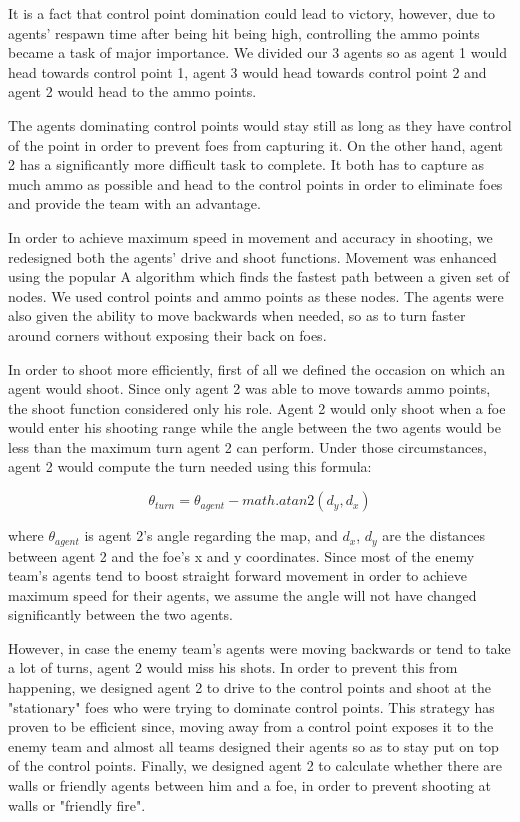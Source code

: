 \documentclass[conference]{IEEEtran}
\begin{document}
It is a fact that control point domination could lead to victory, however, due to agents' respawn time after being hit being high, controlling the ammo points became a task of major importance. We divided our 3 agents so as agent 1 would head towards control point 1, agent 3 would head towards control point 2 and agent 2 would head to the ammo points.

The agents dominating control points would stay still as long as they have control of the point in order to prevent foes from capturing it. On the other hand, agent 2 has a significantly more difficult task to complete. It both has to capture as much ammo as possible and head to the control points in order to eliminate foes and provide the team with an advantage.

In order to achieve maximum speed in movement and accuracy in shooting, we redesigned both the agents' drive and shoot functions. Movement was enhanced using the popular A\* algorithm which finds the fastest path between a given set of nodes. We used control points and ammo points as these nodes. The agents were also given the ability to move backwards when needed, so as to turn faster around corners without exposing their back on foes.

In order to shoot more efficiently, first of all we defined the occasion on which an agent would shoot. Since only agent 2 was able to move towards ammo points, the shoot function considered only his role. Agent 2 would only shoot when a foe would enter his shooting range while the angle between the two agents would be less than the maximum turn agent 2 can perform. Under those circumstances, agent 2 would compute the turn needed using this formula:

\begin{equation}
\theta_{turn} = \theta_{agent} - math.atan2(d_y,d_x)
\end{equation}

where $\theta_{agent}$ is agent 2's angle regarding the map, and $d_x$, $d_y$ are the distances between agent 2 and the foe's x and y coordinates. Since most of the enemy team's agents tend to boost straight forward movement in order to achieve maximum speed for their agents, we assume the angle will not have changed significantly between the two agents.

However, in case the enemy team's agents were moving backwards or tend to take a lot of turns, agent 2 would miss his shots. In order to prevent this from happening, we designed agent 2 to drive to the control points and shoot at the "stationary" foes who were trying to dominate control points. This strategy has proven to be efficient since, moving away from a control point exposes it to the enemy team and almost all teams designed their agents so as to stay put on top of the control points. Finally, we designed agent 2 to calculate whether there are walls or friendly agents between him and a foe, in order to prevent shooting at walls or "friendly fire".
\end{document}
